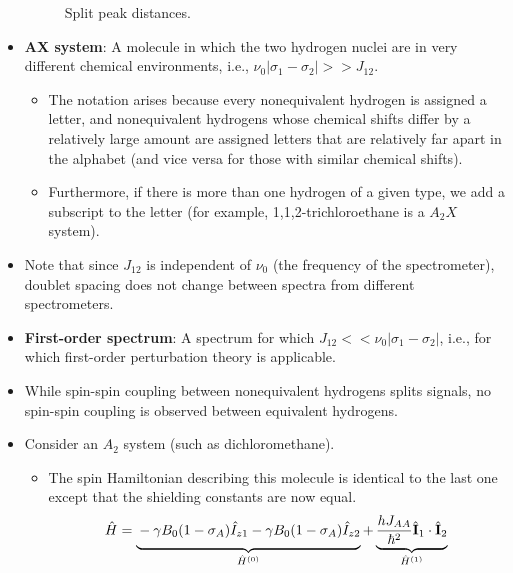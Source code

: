 \documentclass[../notes.tex]{subfiles}
\begin{document}
\begin{itemize}
\begin{figure}[h!]
        \caption{Split peak distances.}
        \label{fig:splitPeakDistances}
    \end{figure}
    \item \textbf{AX system}: A molecule in which the two hydrogen nuclei are in very different chemical environments, i.e., $\nu_0|\sigma_1-\sigma_2|>>J_{12}$.
    \begin{itemize}
        \item The notation arises because every nonequivalent hydrogen is assigned a letter, and nonequivalent hydrogens whose chemical shifts differ by a relatively large amount are assigned letters that are relatively far apart in the alphabet (and vice versa for those with similar chemical shifts).
        \item Furthermore, if there is more than one hydrogen of a given type, we add a subscript to the letter (for example, 1,1,2-trichloroethane is a $A_2X$ system).
    \end{itemize}
    \item Note that since $J_{12}$ is independent of $\nu_0$ (the frequency of the spectrometer), doublet spacing does not change between spectra from different spectrometers.
    \item \textbf{First-order spectrum}: A spectrum for which $J_{12}<<\nu_0|\sigma_1-\sigma_2|$, i.e., for which first-order perturbation theory is applicable.
    \item While spin-spin coupling between nonequivalent hydrogens splits signals, no spin-spin coupling is observed between equivalent hydrogens.
    \item Consider an $A_2$ system (such as dichloromethane).
    \begin{itemize}
        \item The spin Hamiltonian describing this molecule is identical to the last one except that the shielding constants are now equal.
        \begin{equation*}
            \hat{H} = \underbrace{\vphantom{\frac{hJ_{AA}}{\hbar^2}\hat{\mathbf{I}}_1\cdot\hat{\mathbf{I}}_2}-\gamma B_0(1-\sigma_A)\hat{I}_{z1}-\gamma B_0(1-\sigma_A)\hat{I}_{z2}}_{\hat{H}^{(0)}}+\underbrace{\frac{hJ_{AA}}{\hbar^2}\hat{\mathbf{I}}_1\cdot\hat{\mathbf{I}}_2}_{\hat{H}^{(1)}}

\end{equation*}
\end{itemize}
\end{itemize}
\end{document}
